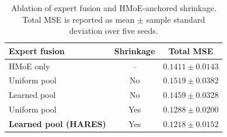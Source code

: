 \begin{table}[t]
\centering
\caption{Ablation of expert fusion and HMoE-anchored shrinkage. Total MSE is reported as mean $\pm$ sample standard deviation over five seeds.}
\label{tab:ablation}
\small
\setlength{\tabcolsep}{4pt}
\renewcommand{\arraystretch}{1.06}
\begin{tabular}{@{}lcc@{}}
\toprule
\textbf{Expert fusion} & \textbf{Shrinkage} & \textbf{Total MSE}\\
\midrule
HMoE only & -- & $0.1411\pm0.0143$\\
\midrule
Uniform pool & No & $0.1519\pm0.0382$\\
Learned pool & No & $0.1459\pm0.0328$\\
Uniform pool & Yes & $0.1288\pm0.0200$\\
\textbf{Learned pool (HARES)} & Yes & $\mathbf{0.1218}\pm0.0152$\\
\bottomrule
\end{tabular}
\vspace{-3mm}
\end{table}
